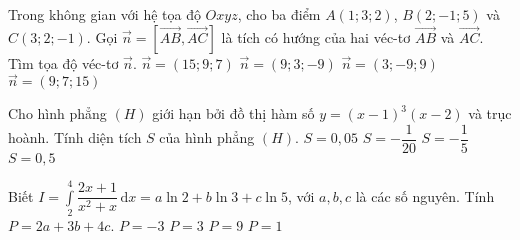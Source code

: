 \begin{ex}%
Trong không gian với hệ tọa độ $Oxyz$, cho ba điểm $A(1;3;2)$, $B(2;-1;5)$ và $C(3;2;-1)$. Gọi $\vec{n} = \left[\overrightarrow{AB},\overrightarrow{AC}\right]$ là tích có hướng của hai véc-tơ $\overrightarrow{AB}$ và $\overrightarrow{AC}$. Tìm tọa độ véc-tơ $\vec{n}$.
\choice
{\True $\vec{n} = (15;9;7)$}
{$\vec{n} = (9;3;-9)$}
{$\vec{n} = (3;-9;9)$}
{$\vec{n} = (9;7;15)$}
\end{ex}


\begin{ex}%
Cho hình phẳng $(H)$ giới hạn bởi đồ thị hàm số $y=(x-1)^3(x-2)$ và trục hoành. Tính diện tích $S$ của hình phẳng $(H)$.
\choice
{\True $S=0{,}05$}
{$S=-\dfrac{1}{20}$}
{$S=-\dfrac{1}{5}$}
{$S=0{,}5$}
\end{ex}

\begin{ex}%
Biết $I = \displaystyle \int \limits_2^4 \dfrac{2x+1}{x^2+x}\mathrm{\,d}x = a \ln 2 + b \ln 3 + c \ln 5$, với $a,b,c$ là các số nguyên. Tính $P = 2a + 3b + 4c$.
\choice
{$P = -3$}
{\True $P = 3$}
{$P = 9$}
{$P = 1$}
\end{ex}


